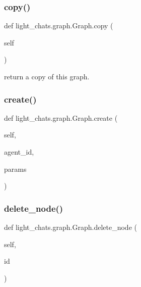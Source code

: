 \subsubsection{\texorpdfstring{copy()}{copy()}}
{\footnotesize\ttfamily def light\+\_\+chats.\+graph.\+Graph.\+copy (\begin{DoxyParamCaption}\item[{}]{self }\end{DoxyParamCaption})}

\begin{DoxyVerb}return a copy of this graph.
\end{DoxyVerb}
 \mbox{\label{classlight__chats_1_1graph_1_1Graph_acc495d94797d39558b1711d0bbf6346d}} 
\subsubsection{\texorpdfstring{create()}{create()}}
{\footnotesize\ttfamily def light\+\_\+chats.\+graph.\+Graph.\+create (\begin{DoxyParamCaption}\item[{}]{self,  }\item[{}]{agent\+\_\+id,  }\item[{}]{params }\end{DoxyParamCaption})}

\mbox{\label{classlight__chats_1_1graph_1_1Graph_a703188eb5340371b8ad793ddebd2af30}} 
\subsubsection{\texorpdfstring{delete\+\_\+node()}{delete\_node()}}
{\footnotesize\ttfamily def light\+\_\+chats.\+graph.\+Graph.\+delete\+\_\+node (\begin{DoxyParamCaption}\item[{}]{self,  }\item[{}]{id }\end{DoxyParamCaption})}

